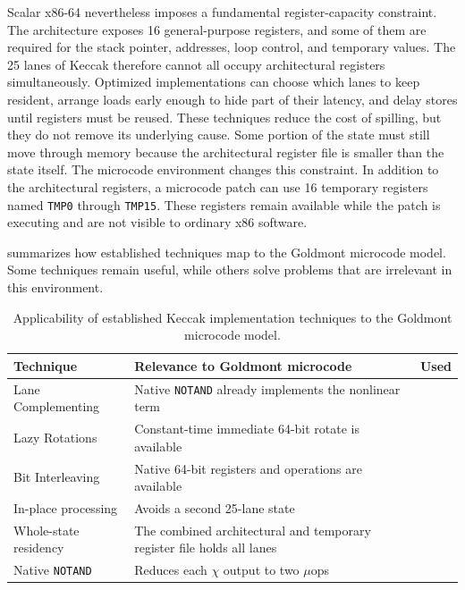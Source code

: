 \documentclass[journal=tches,submission]{iacrtrans}
\newcommand{\code}[1]{\texttt{#1}}
\newcommand{\cmark}{\ding{51}}
\newcommand{\xmark}{\ding{55}}
\begin{document}
Scalar x86-64 nevertheless imposes a fundamental register-capacity constraint.
The architecture exposes 16 general-purpose registers, and some of them are required for the stack pointer, addresses, loop control, and temporary values.
The 25 lanes of Keccak therefore cannot all occupy architectural registers simultaneously.
Optimized implementations can choose which lanes to keep resident, arrange loads early enough to hide part of their latency, and delay stores until registers must be reused.
These techniques reduce the cost of spilling, but they do not remove its underlying cause.
Some portion of the state must still move through memory because the architectural register file is smaller than the state itself.
The microcode environment changes this constraint.
In addition to the architectural registers, a microcode patch can use 16 temporary registers named \code{TMP0} through \code{TMP15}.
These registers remain available while the patch is executing and are not visible to ordinary x86 software.


 summarizes how established techniques map to the Goldmont microcode model.
Some techniques remain useful, while others solve problems that are irrelevant in this environment.

\begin{table}[htbp]
\centering
\small
\begin{tabularx}{\linewidth}{@{}l >{\raggedright\arraybackslash}X c@{}}
\toprule
Technique & Relevance to Goldmont microcode & Used \\
\midrule
Lane Complementing & Native \code{NOTAND} already implements the nonlinear term & \xmark \\
Lazy Rotations & Constant-time immediate 64-bit rotate is available & \xmark \\
Bit Interleaving & Native 64-bit registers and operations are available & \xmark \\
In-place processing & Avoids a second 25-lane state & \cmark \\
Whole-state residency & The combined architectural and temporary register file holds all lanes & \cmark \\
Native \code{NOTAND} & Reduces each $\chi$ output to two $\mu$ops & \cmark \\
\bottomrule
\end{tabularx}
\caption{Applicability of established Keccak implementation techniques to the Goldmont microcode model.}
\label{tab:methods}
\end{table}
\end{document}
